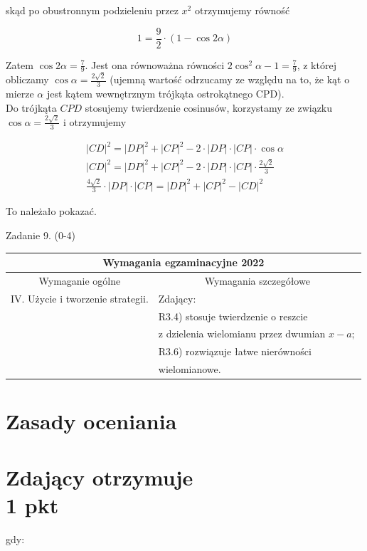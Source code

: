 \documentclass[10pt]{article}
\begin{document}
skąd po obustronnym podzieleniu przez $x^{2}$ otrzymujemy równość

$$
1=\frac{9}{2} \cdot(1-\cos 2 \alpha)
$$

Zatem $\cos 2 \alpha=\frac{7}{9}$. Jest ona równoważna równości $2 \cos ^{2} \alpha-1=\frac{7}{9}$, z której obliczamy $\cos \alpha=\frac{2 \sqrt{2}}{3}$ (ujemną wartość odrzucamy ze względu na to, że kąt o mierze $\alpha$ jest kątem wewnętrznym trójkąta ostrokątnego CPD).\\
Do trójkąta $C P D$ stosujemy twierdzenie cosinusów, korzystamy ze związku $\cos \alpha=\frac{2 \sqrt{2}}{3}$ i otrzymujemy

$$
\begin{gathered}
|C D|^{2}=|D P|^{2}+|C P|^{2}-2 \cdot|D P| \cdot|C P| \cdot \cos \alpha \\
|C D|^{2}=|D P|^{2}+|C P|^{2}-2 \cdot|D P| \cdot|C P| \cdot \frac{2 \sqrt{2}}{3} \\
\frac{4 \sqrt{2}}{3} \cdot|D P| \cdot|C P|=|D P|^{2}+|C P|^{2}-|C D|^{2}
\end{gathered}
$$

To należało pokazać.

Zadanie 9. (0-4)

\begin{center}
\begin{tabular}{|l|l|}
\hline
\multicolumn{2}{|c|}{Wymagania egzaminacyjne 2022} \\
\hline
\multicolumn{1}{|c|}{Wymaganie ogólne} & \multicolumn{1}{|c|}{Wymagania szczegółowe} \\
\hline
IV. Użycie i tworzenie strategii. & Zdający: \\
 & R3.4) stosuje twierdzenie o reszcie \\
 & z dzielenia wielomianu przez dwumian $x-a ;$ \\
 & R3.6) rozwiązuje łatwe nierówności \\
 & wielomianowe. \\
\hline
\end{tabular}
\end{center}

\section*{Zasady oceniania}
\section*{Zdający otrzymuje \\
 1 pkt}
gdy:
\end{document}

